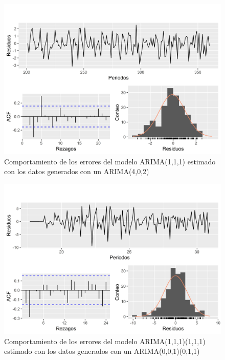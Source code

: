 \documentclass[
]{article}
\begin{document}
\begin{figure}[H]
\includegraphics[width=1\linewidth,height=1\textheight]{Tesis_files/figure-latex/errores_simulados_arima_estandar4-1} \caption{Comportamiento de los errores del modelo ARIMA(1,1,1) estimado con los datos generados con un ARIMA(4,0,2)}\label{fig:errores_simulados_arima_estandar4}
\end{figure}

\begin{figure}[H]
\includegraphics[width=1\linewidth,height=1\textheight]{Tesis_files/figure-latex/errores_simulados_arima_estandar5-1} \caption{Comportamiento de los errores del modelo ARIMA(1,1,1)(1,1,1) estimado con los datos generados con un ARIMA(0,0,1)(0,1,1)}\label{fig:errores_simulados_arima_estandar5}
\end{figure}
\end{document}
